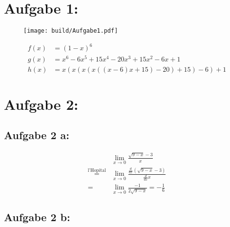 \section*{Aufgabe 1:}

\begin{figure}
  \centering
  \texttt{[image: build/Aufgabe1.pdf]}
\end{figure}

\begin{align*}
	f(x) &= (1-x)^6 \\
	g(x) &= x^6 -6x^5 +15x^4 -20x^3 +15x^2 -6x +1 \\
	h(x) &= x( x( x( x( (x-6)x +15) -20) +15) -6) +1
\end{align*}

\newpage

\section*{Aufgabe 2:}
\subsection*{Aufgabe 2 a:}

\begin{align*}
	& \lim\limits_{x \to 0} \frac{\sqrt{9-x}-3}{x} \\
	\overset{\text{l'Hopital}}{=}& \lim\limits_{x \to 0} \frac{\frac{d}{dx}(\sqrt{9-x}-3)}{\frac{d}{dx}x} \\
	=& \lim\limits_{x \to 0} \frac{-1}{2\sqrt{9-x}} = - \frac{1}{6}
\end{align*}

\subsection*{Aufgabe 2 b:}

